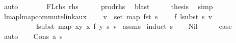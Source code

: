 \begin{isabellebody}
\ auto\isanewline
\ \ \isamarkupfalse%
\ \isamarkupfalse%
\ {\isachardoublequoteopen}{\isachardot}{\kern0pt}{\isachardot}{\kern0pt}{\isachardot}{\kern0pt}\ {\isacharequal}{\kern0pt}\ FLrhs\ rhs{\isachardoublequoteclose}\isanewline
\ \ \ \ \isamarkupfalse%
\ prod{\isacharunderscore}{\kern0pt}rhs{}\ \isamarkupfalse%
\ blast\isanewline
\ \ \isamarkupfalse%
\ \isamarkupfalse%
\ {\isacharquery}{\kern0pt}thesis\ \isamarkupfalse%
\ simp\isanewline
{}\isamarkupfalse%
%
\endisatagproof
{\isafoldproof}%
%
\isadelimproof
%
\endisadelimproof
%
\isadelimdocument
%
\endisadelimdocument
%
\isatagdocument
%
\isamarkuptrue%
%
\endisatagdocument
{\isafolddocument}%
%
\isadelimdocument
%
\endisadelimdocument
{}\isamarkupfalse%
\ lmap{\isacharunderscore}{\kern0pt}lmap{\isacharunderscore}{\kern0pt}commute{\isacharunderscore}{\kern0pt}link{\isacharunderscore}{\kern0pt}aux{\isacharcolon}{\kern0pt}\isanewline
\ \ \ \ {\isachardoublequoteopen}v\ {\isasymin}\ set\ {\isacharparenleft}{\kern0pt}map\ fst\ s{\isacharparenright}{\kern0pt}{\isachardoublequoteclose}\isanewline
\ \ \ \ {\isachardoublequoteopen}f\ {\isacharparenleft}{\kern0pt}lsubst\ s\ v{\isacharparenright}{\kern0pt}\ {\isacharequal}{\kern0pt}\isanewline
\ \ \ \ \ \ \ \ \ \ lsubst\ {\isacharparenleft}{\kern0pt}map\ {\isacharparenleft}{\kern0pt}{\isasymlambda}{\isacharparenleft}{\kern0pt}x{\isacharcomma}{\kern0pt}y{\isacharparenright}{\kern0pt}{\isachardot}{\kern0pt}\ {\isacharparenleft}{\kern0pt}x{\isacharcomma}{\kern0pt}\ f\ y{\isacharparenright}{\kern0pt}{\isacharparenright}{\kern0pt}\ s{\isacharparenright}{\kern0pt}\ v{\isachardoublequoteclose}\isanewline
%
\isadelimproof
%
\endisadelimproof
%
\isatagproof
{}\isamarkupfalse%
\ assms\isanewline
{}\isamarkupfalse%
\ {\isacharparenleft}{\kern0pt}induct\ s{\isacharparenright}{\kern0pt}\isanewline
\ \ \isamarkupfalse%
\ Nil\isanewline
\ \ \isamarkupfalse%
\ \isamarkupfalse%
\ {\isacharquery}{\kern0pt}case\isanewline
\ \ \isamarkupfalse%
\ auto\isanewline
{}\isamarkupfalse%
\isanewline
\ \ \isamarkupfalse%
\ {\isacharparenleft}{\kern0pt}Cons\ a\ s{\isacharparenright}{\kern0pt}\isanewline
\ \ \isamarkupfalse%

\end{isabellebody}
